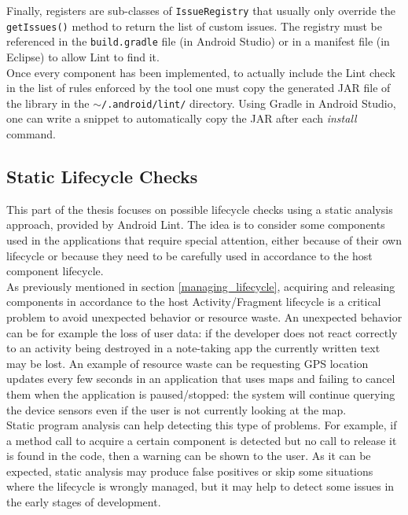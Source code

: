 \documentclass[11pt,a4paper,notitlepage]{article}
\begin{document}
Finally, registers are sub-classes of \texttt{IssueRegistry} that usually only override the \texttt{getIssues()} method to return the list of custom issues. The registry must be referenced in the \texttt{build.gradle} file (in Android Studio) or in a manifest file (in Eclipse) to allow Lint to find it.\bigskip \\
Once every component has been implemented, to actually include the Lint check in the list of rules enforced by the tool one must copy the generated JAR file of the library in the \texttt{$\sim$/.android/lint/} directory. Using Gradle in Android Studio, one can write a snippet to automatically copy the JAR after each \textit{install} command.

\subsection{Static Lifecycle Checks}
This part of the thesis focuses on possible lifecycle checks using a static analysis approach, provided by Android Lint. The idea is to consider some components used in the applications that require special attention, either because of their own lifecycle or because they need to be carefully used in accordance to the host component lifecycle.\medskip \\
As previously mentioned in section \ref{managing_lifecycle}, acquiring and releasing components in accordance to the host Activity/Fragment lifecycle is a critical problem to avoid unexpected behavior or resource waste. An unexpected behavior can be for example the loss of user data: if the developer does not react correctly to an activity being destroyed in a note-taking app the currently written text may be lost. An example of resource waste can be requesting GPS location updates every few seconds in an application that uses maps and failing to cancel them when the application is paused/stopped: the system will continue querying the device sensors even if the user is not currently looking at the map.\bigskip \\
Static program analysis can help detecting this type of problems. For example, if a method call to acquire a certain component is detected but no call to release it is found in the code, then a warning can be shown to the user. As it can be expected, static analysis may produce false positives or skip some situations where the lifecycle is wrongly managed, but it may help to detect some issues in the early stages of development.
\end{document}
